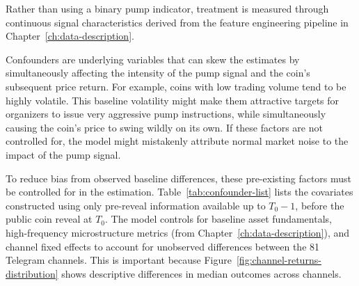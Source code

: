 Rather than using a binary pump indicator, treatment is measured through continuous signal characteristics derived from the feature engineering pipeline in Chapter~\ref{ch:data-description}. 

Confounders are underlying variables that can skew the estimates by simultaneously affecting the intensity of the pump signal and the coin's subsequent price return. For example, coins with low trading volume tend to be highly volatile. This baseline volatility might make them attractive targets for organizers to issue very aggressive pump instructions, while simultaneously causing the coin's price to swing wildly on its own. If these factors are not controlled for, the model might mistakenly attribute normal market noise to the impact of the pump signal.

To reduce bias from observed baseline differences, these pre-existing factors must be controlled for in the estimation. Table~\ref{tab:confounder-list} lists the covariates constructed using only pre-reveal information available up to $T_0 - 1$, before the public coin reveal at $T_0$. The model controls for baseline asset fundamentals, high-frequency microstructure metrics (from Chapter~\ref{ch:data-description}), and channel fixed effects to account for unobserved differences between the 81 Telegram channels. This is important because Figure~\ref{fig:channel-returns-distribution} shows descriptive differences in median outcomes across channels.

